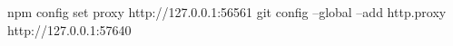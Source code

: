 npm config set proxy http://127.0.0.1:56561
git config --global --add http.proxy http://127.0.0.1:57640